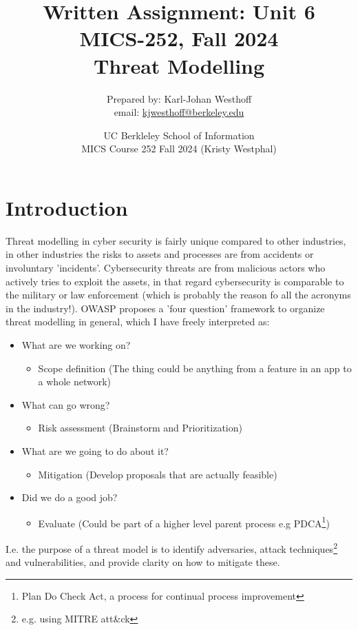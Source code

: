 \documentclass[
	letterpaper, %
	10pt, %
	unnumberedsections, %
	twoside, %
]{APAAssignment}
\title{Written Assignment: Unit 6 \\ MICS-252, Fall 2024 \\ Threat Modelling} %
\date{UC Berkleley School of Information \\
MICS Course 252 Fall 2024 (Kristy Westphal)
}
\author{
	Prepared by: Karl-Johan Westhoff \\
	email: \href{mailto:kjwesthoff@berkeley.edu}{kjwesthoff@berkeley.edu}
}
\begin{document}
\onecolumn
\maketitle %



\section{Introduction}
Threat modelling in cyber security is fairly unique compared to other industries, in other industries the risks to assets and processes are from accidents or involuntary 'incidents'. Cybersecurity threats are from malicious actors who actively tries to exploit the assets, in that regard cybersecurity is comparable to the military or law enforcement (which is probably the reason fo all the acronyms in the industry!). OWASP proposes a 'four question' framework\cite{OWASP_ThreatModellingProject} to organize threat modelling in general, which I have freely interpreted as:


\begin{spacing}{1}
\begin{itemize}
	\item What are we working on?
	\begin{itemize}
		\item Scope definition (The thing could be anything from a feature in an app to a whole network)
	\end{itemize}
	\item What can go wrong?
	\begin{itemize}
		\item Risk assessment (Brainstorm and Prioritization)	
	\end{itemize}
	\item What are we going to do about it?
	\begin{itemize}
		\item Mitigation (Develop proposals that are actually feasible)
	\end{itemize}
	\item Did we do a good job?
	\begin{itemize}
		\item Evaluate (Could be part of a higher level parent process e.g PDCA\footnote{Plan Do Check Act, a process for continual process improvement\cite{PDCA_Wiki}})
	\end{itemize}
\end{itemize}
\end{spacing}
I.e. the purpose of a threat model is to identify adversaries, attack techniques\footnote{e.g. using MITRE att\&ck} and vulnerabilities, and provide clarity on how to mitigate these.   
\end{document}

